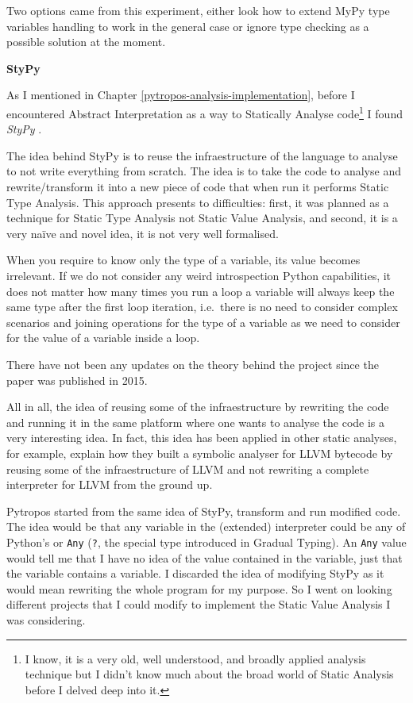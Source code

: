 \documentclass[
11pt, %
english, %
singlespacing, %
headsepline, %
]{MastersDoctoralThesis} %
\newcommand{\nonsection}[1]{\vspace{3mm}\noindent\textbf{\large #1}\vspace{2mm}}
\begin{document}
Two options came from this experiment, either look how to extend MyPy
type variables handling to work in the general case or ignore type
checking as a possible solution at the moment.

{\nonsection{StyPy}}

As I mentioned in Chapter \ref{pytropos-analysis-implementation}, before
I encountered Abstract Interpretation as a way to Statically Analyse
code\footnote{I know, it is a very old, well understood, and broadly
  applied analysis technique but I didn't know much about the broad
  world of Static Analysis before I delved deep into it.} I found
\emph{StyPy} \autocite{ortin_towards_2015}.

The idea behind StyPy is to reuse the infraestructure of the language to
analyse to not write everything from scratch. The idea is to take the
code to analyse and rewrite/transform it into a new piece of code that
when run it performs Static Type Analysis. This approach presents to
difficulties: first, it was planned as a technique for Static Type
Analysis not Static Value Analysis, and second, it is a very naïve and
novel idea, it is not very well formalised.

When you require to know only the type of a variable, its value becomes
irrelevant. If we do not consider any weird introspection Python
capabilities, it does not matter how many times you run a loop a
variable will always keep the same type after the first loop iteration,
i.e.~there is no need to consider complex scenarios and joining
operations for the type of a variable as we need to consider for the
value of a variable inside a loop.

There have not been any updates on the theory behind the project since
the paper was published in 2015.

All in all, the idea of reusing some of the infraestructure by rewriting
the code and running it in the same platform where one wants to analyse
the code is a very interesting idea. In fact, this idea has been applied
in other static analyses, for example, \textcite{lauko_symbolic_2018}
explain how they built a symbolic analyser for LLVM bytecode by reusing
some of the infraestructure of LLVM and not rewriting a complete
interpreter for LLVM from the ground up.

Pytropos started from the same idea of StyPy, transform and run modified
code. The idea would be that any variable in the (extended) interpreter
could be any of Python's or \texttt{Any} (\texttt{?}, the special type
introduced in Gradual Typing). An \texttt{Any} value would tell me that
I have no idea of the value contained in the variable, just that the
variable contains a variable. I discarded the idea of modifying StyPy as
it would mean rewriting the whole program for my purpose. So I went on
looking different projects that I could modify to implement the Static
Value Analysis I was considering.
\end{document}
